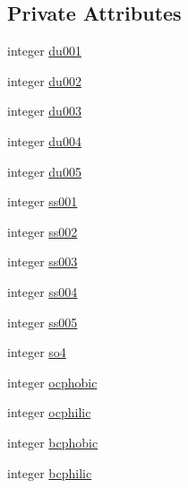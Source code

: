 \subsection*{Private Attributes}
\begin{DoxyCompactItemize}
\item 
integer \hyperlink{structmodule__radiation__aerosols_1_1tracer__index__type_af4355efd112704adbaeab5a3fd1d7912}{du001}
\item 
integer \hyperlink{structmodule__radiation__aerosols_1_1tracer__index__type_ab68920703fa2cda7cbc42cb568a2ed56}{du002}
\item 
integer \hyperlink{structmodule__radiation__aerosols_1_1tracer__index__type_a9b2422518e2c8aaba9f0b64bd0c4676a}{du003}
\item 
integer \hyperlink{structmodule__radiation__aerosols_1_1tracer__index__type_a69658f70ffccecfae1751c227ec1b14c}{du004}
\item 
integer \hyperlink{structmodule__radiation__aerosols_1_1tracer__index__type_aabd67af89106955952b0010bb3a70e4e}{du005}
\item 
integer \hyperlink{structmodule__radiation__aerosols_1_1tracer__index__type_acce0ecff4d4e84dffc0c23965053ac36}{ss001}
\item 
integer \hyperlink{structmodule__radiation__aerosols_1_1tracer__index__type_a9e96ed67b1e072d97314bc9e6e09eee7}{ss002}
\item 
integer \hyperlink{structmodule__radiation__aerosols_1_1tracer__index__type_a5aef8974607bb85ae1a23598a402adfb}{ss003}
\item 
integer \hyperlink{structmodule__radiation__aerosols_1_1tracer__index__type_a88d0024b6f7f6fa3ae4e1da0e9ce7db8}{ss004}
\item 
integer \hyperlink{structmodule__radiation__aerosols_1_1tracer__index__type_a3c67144cb8aeedfb6c51c474a5072605}{ss005}
\item 
integer \hyperlink{structmodule__radiation__aerosols_1_1tracer__index__type_aa73b4be9d303cfce2c00407204c5f930}{so4}
\item 
integer \hyperlink{structmodule__radiation__aerosols_1_1tracer__index__type_a3ace1c1bbade423efd216e676511c470}{ocphobic}
\item 
integer \hyperlink{structmodule__radiation__aerosols_1_1tracer__index__type_a95e99f68fc7344f78f2ee316bc447651}{ocphilic}
\item 
integer \hyperlink{structmodule__radiation__aerosols_1_1tracer__index__type_a4b1c1a1b44b5eb68ec19abb48e748fa0}{bcphobic}
\item 
integer \hyperlink{structmodule__radiation__aerosols_1_1tracer__index__type_a776ae744bfaad492a1aeccf32864d1a0}{bcphilic}
\end{DoxyCompactItemize}


